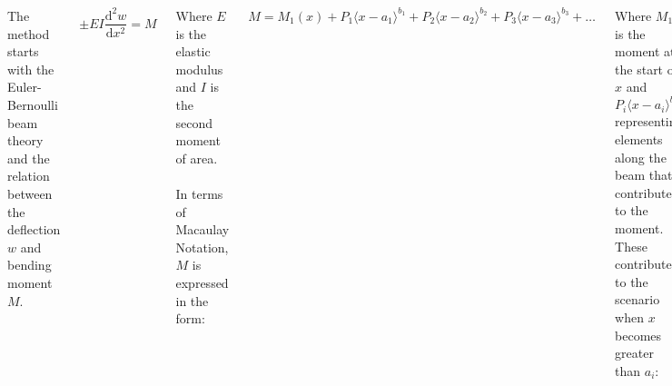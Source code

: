 \documentclass[20pt, a0paper, portrait]{tikzposter}
\begin{document}
\begin{columns}
{        The method starts with the Euler-Bernoulli beam theory and the relation between the deflection $w$ and bending moment $M$.

        \begin{equation}
          \pm EI\frac{\text{d}^2 w}{\text{d}x^2} = M
        \end{equation}

        \noindent Where $E$ is the elastic modulus and $I$ is the second moment of area.\\~\\

        In terms of Macaulay Notation, $M$ is expressed in the form:

        \begin{equation}
          M = M_1(x) + P_1\langle x-a_1\rangle^{b_1} + P_2\langle x-a_2\rangle^{b_2} + P_3\langle x-a_3\rangle^{b_3} + \ldots
        \end{equation}

        \noindent Where $M_1$ is the moment at the start of $x$ and $P_i\langle x-a_i\rangle^{b_i}$ representing elements along the beam that contribute to the moment. These contribute to the scenario when $x$ becomes greater than $a_i$:

        \begin{equation}
          \langle x - a_i\rangle = 
          \begin{cases} 
            0 & \mathrm{if}~ x < a_i \\ 
            x - a_i & \mathrm{if}~ x > a_i 
          \end{cases}
        \end{equation}

        \noindent $b_i$ is determined by the type of loading that is being applied. 
      }
\end{columns}
\end{document}
